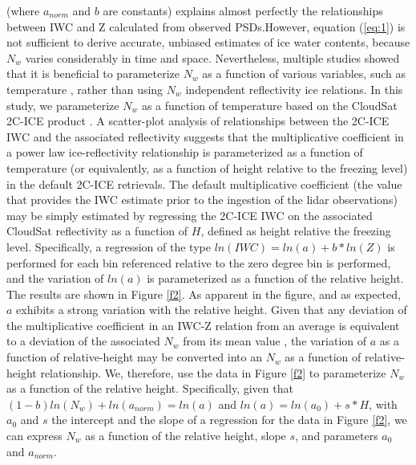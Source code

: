 \documentclass{ametsocV6.1}
\begin{document}
(where $a_{norm}$ and $b$ are constants) explains almost perfectly the relationships between IWC and Z calculated from observed PSDs.However, equation (\ref{eq:1}) is not  sufficient to derive accurate, unbiased estimates of ice water contents, because $N_w$ varies considerably in time and space. Nevertheless, multiple studies showed that it is beneficial to parameterize $N_w$ as a function  of various variables, such as temperature \citep{hogan2006retrieval, delanoe2008variational,deng2010tropical}, rather than using $N_w$ independent reflectivity ice relations.  In this study, we parameterize $N_w$ as a function of temperature based on the CloudSat 2C-ICE product \citep{deng2010tropical,deng2013evaluation}. A scatter-plot analysis of relationships between the 2C-ICE IWC and the associated reflectivity suggests that the multiplicative coefficient in a power law ice-reflectivity relationship is parameterized as a function of temperature (or equivalently, as a function of height relative to the freezing level) in the default 2C-ICE retrievals. The default multiplicative coefficient (the value that provides the IWC estimate prior to the ingestion of the lidar observations) may be simply estimated by regressing the 2C-ICE IWC on the associated CloudSat reflectivity as a function of $H$, defined as height relative the freezing level. Specifically, a regression of the type $ln(IWC)=ln(a)+b*ln(Z)$ is performed for each bin referenced relative to the zero degree bin is performed, and the variation of $ln(a)$ is parameterized as a function of the relative height.  The results are shown in Figure \ref{f2}. As apparent in the figure, and as expected, $a$ exhibits a strong variation with the relative height. Given that any deviation of the multiplicative coefficient in an IWC-Z relation from an average is equivalent to a deviation of the associated $N_w$ from its mean value \citep{ferreira2001,delanoe2014}, the variation of $a$ as a function of relative-height may be converted into an $N_w$ as a function of relative-height relationship.  We, therefore, use the data in Figure \ref{f2} to parameterize $N_w$ as a function of the relative height.  Specifically, given that $(1-b)ln(N_w)+ln(a_{norm})=ln(a)$ and $ln(a)=ln(a_0)+s*H$, with $a_0$ and $s$ the intercept and the slope of a regression for the data in Figure \ref{f2}, we can express $N_w$ as a function of the relative height, slope $s$, and parameters $a_0$ and $a_{norm}$.
\end{document}
